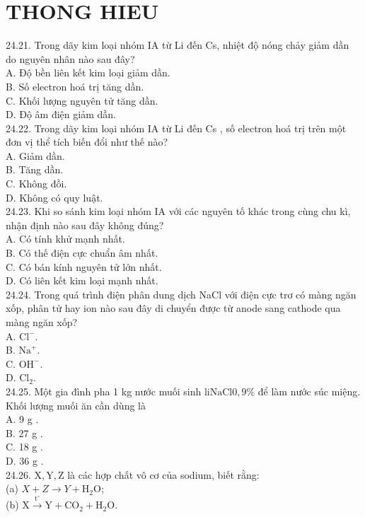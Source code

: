 \documentclass[10pt]{article}
\begin{document}
\section*{THONG HIEU}
24.21. Trong dãy kim loại nhóm IA từ Li đến Cs, nhiệt độ nóng chảy giảm dần do nguyên nhân nào sau đây?\\
A. Độ bền liên kết kim loại giảm dần.\\
B. Số electron hoá trị tăng dần.\\
C. Khối lượng nguyên tử tăng dần.\\
D. Độ âm điện giảm dần.\\
24.22. Trong dãy kim loại nhóm IA từ Li đến Cs , số electron hoá trị trên một đơn vị thể tích biến đổi như thế nào?\\
A. Giảm dần.\\
B. Tăng dần.\\
C. Không đồi.\\
D. Không có quy luật.\\
24.23. Khi so sánh kim loại nhóm IA với các nguyên tố khác trong cùng chu kì, nhận định nào sau đây không đúng?\\
A. Có tính khử mạnh nhất.\\
B. Có thế điện cực chuẩn âm nhất.\\
C. Có bán kính nguyên tử lớn nhất.\\
D. Có liên kết kim loại mạnh nhất.\\
24.24. Trong quá trình điện phân dung dịch NaCl với điện cực trơ có màng ngăn xốp, phân tử hay ion nào sau đây di chuyển được từ anode sang cathode qua màng ngăn xốp?\\
A. $\mathrm{Cl}^{-}$.\\
B. $\mathrm{Na}^{+}$.\\
C. $\mathrm{OH}^{-}$.\\
D. $\mathrm{Cl}_{2}$.\\
24.25. Một gia đình pha 1 kg nước muối sinh $\mathrm{li} \mathrm{NaCl} 0,9 \%$ để làm nước súc miệng. Khối lượng muối ăn cần dùng là\\
A. 9 g .\\
B. 27 g .\\
C. 18 g .\\
D. 36 g .\\
24.26. $\mathrm{X}, \mathrm{Y}, \mathrm{Z}$ là các hợp chất vô cơ của sodium, biết rằng:\\
(a) $X+Z \longrightarrow Y+\mathrm{H}_{2} \mathrm{O}$;\\
(b) $\mathrm{X} \xrightarrow{\mathrm{t}^{\circ}} \mathrm{Y}+\mathrm{CO}_{2}+\mathrm{H}_{2} \mathrm{O}$.
\end{document}
